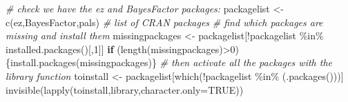 \documentclass[
]{article}
\newenvironment{Shaded}{\begin{snugshade}}{\end{snugshade}}
\newcommand{\AttributeTok}[1]{\textcolor[rgb]{0.77,0.63,0.00}{#1}}
\newcommand{\CommentTok}[1]{\textcolor[rgb]{0.56,0.35,0.01}{\textit{#1}}}
\newcommand{\ConstantTok}[1]{\textcolor[rgb]{0.00,0.00,0.00}{#1}}
\newcommand{\ControlFlowTok}[1]{\textcolor[rgb]{0.13,0.29,0.53}{\textbf{#1}}}
\newcommand{\DecValTok}[1]{\textcolor[rgb]{0.00,0.00,0.81}{#1}}
\newcommand{\FunctionTok}[1]{\textcolor[rgb]{0.00,0.00,0.00}{#1}}
\newcommand{\NormalTok}[1]{#1}
\newcommand{\OtherTok}[1]{\textcolor[rgb]{0.56,0.35,0.01}{#1}}
\newcommand{\SpecialCharTok}[1]{\textcolor[rgb]{0.00,0.00,0.00}{#1}}
\newcommand{\StringTok}[1]{\textcolor[rgb]{0.31,0.60,0.02}{#1}}
\begin{document}
\begin{Shaded}
\begin{Highlighting}[]
\CommentTok{\# check we have the ez and BayesFactor packages:}
\NormalTok{packagelist }\OtherTok{\textless{}{-}} \FunctionTok{c}\NormalTok{(}\StringTok{\textquotesingle{}ez\textquotesingle{}}\NormalTok{,}\StringTok{\textquotesingle{}BayesFactor\textquotesingle{}}\NormalTok{,}\StringTok{\textquotesingle{}pals\textquotesingle{}}\NormalTok{) }\CommentTok{\# list of CRAN packages}
\CommentTok{\# find which packages are missing and install them}
\NormalTok{missingpackages }\OtherTok{\textless{}{-}}\NormalTok{ packagelist[}\SpecialCharTok{!}\NormalTok{packagelist }\SpecialCharTok{\%in\%} \FunctionTok{installed.packages}\NormalTok{()[,}\DecValTok{1}\NormalTok{]]}
\ControlFlowTok{if}\NormalTok{ (}\FunctionTok{length}\NormalTok{(missingpackages)}\SpecialCharTok{\textgreater{}}\DecValTok{0}\NormalTok{)\{}\FunctionTok{install.packages}\NormalTok{(missingpackages)\}}
\CommentTok{\# then activate all the packages with the library function}
\NormalTok{toinstall }\OtherTok{\textless{}{-}}\NormalTok{ packagelist[}\FunctionTok{which}\NormalTok{(}\SpecialCharTok{!}\NormalTok{packagelist }\SpecialCharTok{\%in\%}\NormalTok{ (}\FunctionTok{.packages}\NormalTok{()))]}
\FunctionTok{invisible}\NormalTok{(}\FunctionTok{lapply}\NormalTok{(toinstall,library,}\AttributeTok{character.only=}\ConstantTok{TRUE}\NormalTok{))}


\end{Highlighting}
\end{Shaded}
\end{document}

